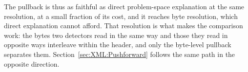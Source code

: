 The pullback is thus as faithful as direct problem-space explanation at the same resolution, at a small fraction of its
cost, and it reaches byte resolution, which direct explanation cannot afford. That resolution is what makes the
comparison work: the bytes two detectors read in the same way and those they read in opposite ways interleave within the
header, and only the byte-level pullback separates them. Section~\ref{sec:XML:Pushforward} follows the same path in the
opposite direction.

